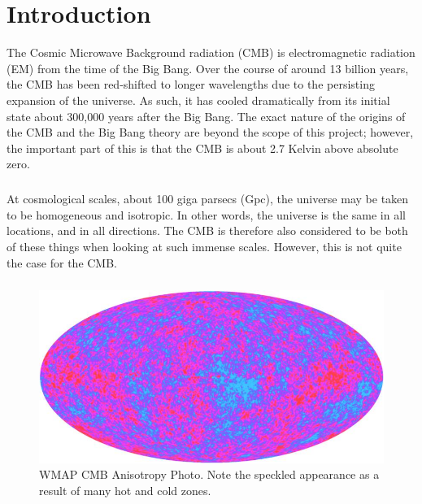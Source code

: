 \documentclass[twoside, fontsize=12pt,
     bibliography=totoc, %
     listof=totoc, %
     index=totoc, %
     onehalfspacing %
]{_MScDiss2017_cls}
\begin{document}
\newpage%
\cleardoublepage
{}%


\chapter{Introduction}
The Cosmic Microwave Background radiation (CMB) is electromagnetic radiation (EM) from the time of the Big Bang. Over the course of around 13 billion years, the CMB has been red-shifted to longer wavelengths due to the persisting expansion of the universe. As such, it has cooled dramatically from its initial state about 300,000 years after the Big Bang. The exact nature of the origins of the CMB and the Big Bang theory are beyond the scope of this project; however, the important part of this is that the CMB is about 2.7 Kelvin above absolute zero. \cite{PostgradCMB}

\paragraph{}

At cosmological scales, about 100 giga parsecs (Gpc), the universe may be taken to be homogeneous and isotropic. In other words, the universe is the same in all locations, and in all directions. The CMB is therefore also considered to be both of these things when looking at such immense scales. However, this is not quite the case for the CMB.

\paragraph{}

\begin{figure}
	\begin{center}
	\includegraphics[width=\textwidth]{WMAP-map}
	\caption{WMAP CMB Anisotropy Photo. Note the speckled appearance as a result of many hot and cold zones. \cite{UCLA}}
	\label{wmapcmb}
	\end{center}
\end{figure}
\end{document}
